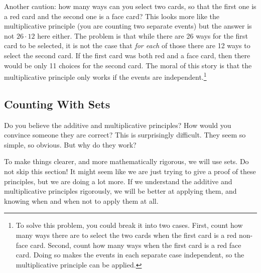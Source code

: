 \documentclass[10pt,]{book}
\theoremstyle{plain}
\theoremstyle{definition}
\theoremstyle{definition}
\theoremstyle{definition}
\numberwithin{equation}{section}
\begin{document}
Another caution: how many ways can you select two cards, so that the first one is a red card and the second one is a face card? This looks more like the multiplicative principle (you are counting two separate events) but the answer is not \(26 \cdot 12\) here either. The problem is that while there are 26 ways for the first card to be selected, it is not the case that \emph{for each} of those there are 12 ways to select the second card. If the first card was both red and a face card, then there would be only 11 choices for the second card. The moral of this story is that the multiplicative principle only works if the events are independent.\footnote{To solve this problem, you could break it into two cases. First, count how many ways there are to select the two cards when the first card is a red non-face card. Second, count how many ways when the first card is a red face card.  Doing so makes the events in each separate case independent, so the multiplicative principle can be applied.\label{fn-1}}
%
\typeout{************************************************}
\typeout{************************************************}
\subsection[Counting With Sets]{Counting With Sets}\label{subsec_countingWithSets}

Do you believe the additive and multiplicative principles? How would you convince someone they are correct? This is surprisingly difficult. They seem so simple, so obvious. But why do they work?
%
\par

To make things clearer, and more mathematically rigorous, we will use sets. Do not skip this section! It might seem like we are just trying to give a proof of these principles, but we are doing a lot more. If we understand the additive and multiplicative principles rigorously, we will be better at applying them, and knowing when and when not to apply them at all.
%
\par
\end{document}
